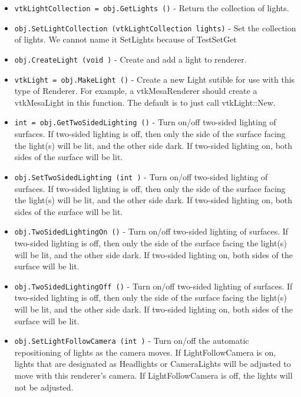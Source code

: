\begin{itemize}
\item  \verb|vtkLightCollection = obj.GetLights ()| -  Return the collection of lights.

\item  \verb|obj.SetLightCollection (vtkLightCollection lights)| -  Set the collection of lights.
 We cannot name it SetLights because of TestSetGet
 
 

\item  \verb|obj.CreateLight (void )| -  Create and add a light to renderer.

\item  \verb|vtkLight = obj.MakeLight ()| -  Create a new Light sutible for use with this type of Renderer.
 For example, a vtkMesaRenderer should create a vtkMesaLight
 in this function.   The default is to just call vtkLight::New.

\item  \verb|int = obj.GetTwoSidedLighting ()| -  Turn on/off two-sided lighting of surfaces. If two-sided lighting is
 off, then only the side of the surface facing the light(s) will be lit,
 and the other side dark. If two-sided lighting on, both sides of the
 surface will be lit.

\item  \verb|obj.SetTwoSidedLighting (int )| -  Turn on/off two-sided lighting of surfaces. If two-sided lighting is
 off, then only the side of the surface facing the light(s) will be lit,
 and the other side dark. If two-sided lighting on, both sides of the
 surface will be lit.

\item  \verb|obj.TwoSidedLightingOn ()| -  Turn on/off two-sided lighting of surfaces. If two-sided lighting is
 off, then only the side of the surface facing the light(s) will be lit,
 and the other side dark. If two-sided lighting on, both sides of the
 surface will be lit.

\item  \verb|obj.TwoSidedLightingOff ()| -  Turn on/off two-sided lighting of surfaces. If two-sided lighting is
 off, then only the side of the surface facing the light(s) will be lit,
 and the other side dark. If two-sided lighting on, both sides of the
 surface will be lit.

\item  \verb|obj.SetLightFollowCamera (int )| -  Turn on/off the automatic repositioning of lights as the camera moves.
 If LightFollowCamera is on, lights that are designated as Headlights
 or CameraLights will be adjusted to move with this renderer's camera.
 If LightFollowCamera is off, the lights will not be adjusted.


\end{itemize}

